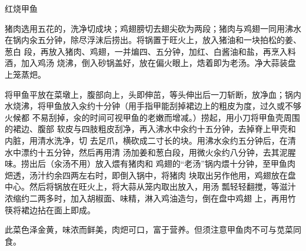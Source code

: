 \begin{recipe}{红烧甲鱼}

\ingredients


\preparation

\step 猪肉选用五花的，洗净切成块；鸡翅膀切去翅尖砍为两段；猪肉与鸡翅一同用沸水
在锅内汆五分钟，除尽浮沫后捞出。将锅置于旺火上，放入猪油和一块拍松的姜、葱白
段，再放入猪肉、鸡翅，一并煸四、五分钟，加红、白酱油和盐，再烹入料酒，加入鸡汤
烧沸，倒入砂锅盖好，放在偏火眼上，焅着即为老汤。净大蒜装盘上笼蒸𤆵。

\step 将甲鱼平放在菜墩上，腹部向上，头即伸茁，等头伸出后一刀斩断，放净血；锅内
水烧沸，将甲鱼放入汆约十分钟（用手指甲能刮掉裙边上的粗皮为度，过久或不够火候都
不易刮掉，汆的时间可视甲鱼的老嫩而增减。）捞起，用小刀将甲鱼壳周围的裙边、腹部
软皮与四肢粗皮刮净，再入沸水中汆约十五分钟，去掉脊上甲壳和内脏，用清水洗净，切
去足爪，横砍成二寸长的块。用沸水汆约五分钟后，在清水中漂约十五分钟，然后再用清
汤加姜和葱白段，用微火汆约八分钟，去其泥腥味。捞出后（汆汤不用）放入煨有猪肉和
鸡翅的“老汤”锅内煨十分钟，至甲鱼肉𤆵透，汤汁约余四两左右时，即倒入锅中，将猪肉
块取出另作他用，鸡翅放在盘中心。然后将锅放在旺火上，将大蒜从笼内取出放入，用汤
瓢轻轻翻搅，等滋汁浓缩约二两多时，加入胡椒面、味精，淋入鸡油造匀，倒在盘中鸡翅
上，再用竹筷将裙边拈在面上即成。

\features

此菜色泽金黄，味浓而鲜美，肉𤆵可口，富于营养。但须注意甲鱼肉不可与苋菜同食。

\end{recipe}

